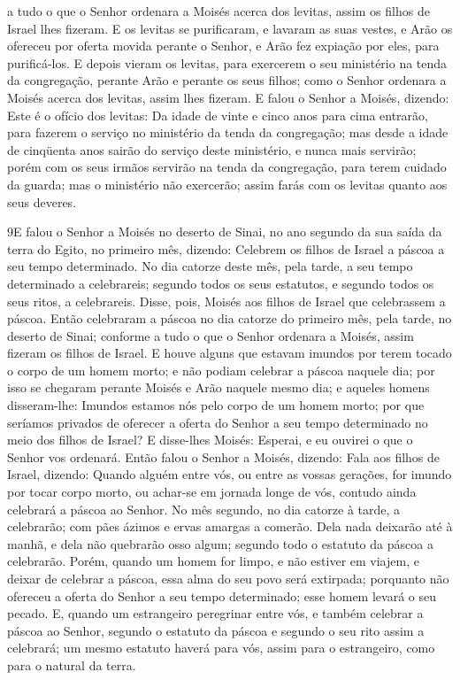 a tudo o que o Senhor ordenara a Moisés acerca dos levitas, assim os
filhos de Israel lhes fizeram. E os levitas se purificaram, e
lavaram as suas vestes, e Arão os ofereceu por oferta movida perante
o Senhor, e Arão fez expiação por eles, para purificá-los. E
depois vieram os levitas, para exercerem o seu ministério na tenda
da congregação, perante Arão e perante os seus filhos; como o Senhor
ordenara a Moisés acerca dos levitas, assim lhes fizeram. E
falou o Senhor a Moisés, dizendo: Este é o ofício dos
levitas: Da idade de vinte e cinco anos para cima entrarão, para
fazerem o serviço no ministério da tenda da congregação; mas
desde a idade de cinqüenta anos sairão do serviço deste ministério,
e nunca mais servirão; porém com os seus irmãos servirão na
tenda da congregação, para terem cuidado da guarda; mas o ministério
não exercerão; assim farás com os levitas quanto aos seus deveres.

\medskip

\lettrine{9} E falou o Senhor a Moisés no deserto de Sinai, no
ano segundo da sua saída da terra do Egito, no primeiro mês,
dizendo: Celebrem os filhos de Israel a páscoa a seu tempo
determinado. No dia catorze deste mês, pela tarde, a seu tempo
determinado a celebrareis; segundo todos os seus estatutos, e
segundo todos os seus ritos, a celebrareis. Disse, pois, Moisés
aos filhos de Israel que celebrassem a páscoa. Então celebraram
a páscoa no dia catorze do primeiro mês, pela tarde, no deserto de
Sinai; conforme a tudo o que o Senhor ordenara a Moisés, assim
fizeram os filhos de Israel. E houve alguns que estavam imundos
por terem tocado o corpo de um homem morto; e não podiam celebrar a
páscoa naquele dia; por isso se chegaram perante Moisés e Arão
naquele mesmo dia; e aqueles homens disseram-lhe: Imundos
estamos nós pelo corpo de um homem morto; por que seríamos privados
de oferecer a oferta do Senhor a seu tempo determinado no meio dos
filhos de Israel? E disse-lhes Moisés: Esperai, e eu ouvirei o
que o Senhor vos ordenará. Então falou o Senhor a Moisés,
dizendo: Fala aos filhos de Israel, dizendo: Quando alguém
entre vós, ou entre as vossas gerações, for imundo por tocar corpo
morto, ou achar-se em jornada longe de vós, contudo ainda celebrará
a páscoa ao Senhor. No mês segundo, no dia catorze à tarde, a
celebrarão; com pães ázimos e ervas amargas a comerão. Dela
nada deixarão até à manhã, e dela não quebrarão osso algum; segundo
todo o estatuto da páscoa a celebrarão. Porém, quando um
homem for limpo, e não estiver em viajem, e deixar de celebrar a
páscoa, essa alma do seu povo será extirpada; porquanto não ofereceu
a oferta do Senhor a seu tempo determinado; esse homem levará o seu
pecado. E, quando um estrangeiro peregrinar entre vós, e
também celebrar a páscoa ao Senhor, segundo o estatuto da páscoa e
segundo o seu rito assim a celebrará; um mesmo estatuto haverá para
vós, assim para o estrangeiro, como para o natural da terra.


